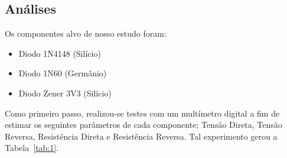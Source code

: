 \documentclass[12pt,a4paper]{article}
\begin{document}
\subsection{Análises}
Os componentes alvo de nosso estudo foram:
\begin{itemize}
  \item  Diodo 1N4148 (Silício)
  \item  Diodo 1N60 (Germânio)
  \item Diodo Zener 3V3 (Silício)
\end{itemize}
  Como primeiro passo, realizou-se testes com um multímetro digital a fim de estimar os seguintes parâmetros de cada componente; Tensão Direta, Tensão Reversa, Resistência Direta e Resistência Reversa. Tal experimento gerou a Tabela~\ref{tab:1}.
\end{document}
